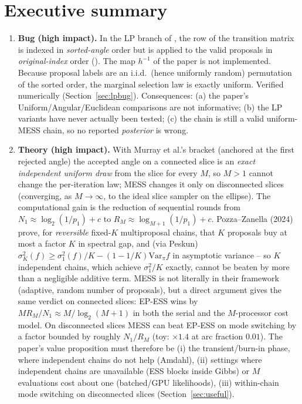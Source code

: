 \documentclass[11pt,a4paper]{article}
\theoremstyle{remark}
\begin{document}
\section{Executive summary}
\begin{enumerate}[leftmargin=*]
\item \textbf{Bug (high impact).} In the LP branch of , the row of the transition matrix is indexed in \emph{sorted-angle} order but is applied to the valid proposals in \emph{original-index} order (). The map $h^{-1}$ of the paper is not implemented. Because proposal labels are an i.i.d.\ (hence uniformly random) permutation of the sorted order, the marginal selection law is exactly uniform. Verified numerically (Section~\ref{sec:lpbug}). Consequences: (a) the paper's Uniform/Angular/Euclidean comparisons are not informative; (b) the LP variants have never actually been tested; (c) the chain is still a valid uniform-MESS chain, so no reported \emph{posterior} is wrong.
\item \textbf{Theory (high impact).} With Murray et al.'s bracket (anchored at the first rejected angle) the accepted angle on a connected slice is an \emph{exact independent uniform draw} from the slice for every $M$, so $M>1$ cannot change the per-iteration law; MESS changes it only on disconnected slices (converging, as $M\to\infty$, to the ideal slice sampler on the ellipse). The computational gain is the reduction of sequential rounds from $N_1\approx\log_2(1/p_1)+c$ to $R_M\approx\log_{M+1}(1/p_1)+c$. Pozza--Zanella (2024) prove, for \emph{reversible} fixed-$K$ multiproposal chains, that $K$ proposals buy at most a factor $K$ in spectral gap, and (via Peskun) $\sigma^2_K(f)\ge\sigma^2_1(f)/K-(1-1/K)\mathrm{Var}_\pi f$ in asymptotic variance -- so $K$ independent chains, which achieve $\sigma^2_1/K$ exactly, cannot be beaten by more than a negligible additive term. MESS is not literally in their framework (adaptive, random number of proposals), but a direct argument gives the same verdict on connected slices: EP-ESS wins by $MR_M/N_1\approx M/\log_2(M+1)$ in both the serial and the $M$-processor cost model. On disconnected slices MESS can beat EP-ESS on mode switching by a factor bounded by roughly $N_1/R_M$ (toy: $\times1.4$ at arc fraction $0.01$). The paper's value proposition must therefore be (i) the transient/burn-in phase, where independent chains do not help (Amdahl), (ii) settings where independent chains are unavailable (ESS blocks inside Gibbs) or $M$ evaluations cost about one (batched/GPU likelihoods), (iii) within-chain mode switching on disconnected slices (Section~\ref{sec:useful}).

\end{enumerate}
\end{document}
